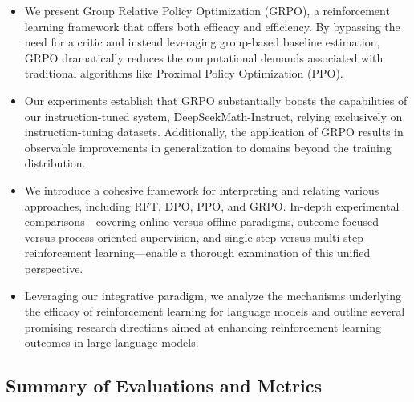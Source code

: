 \begin{itemize}[topsep=0pt]
    \item We present Group Relative Policy Optimization (GRPO), a reinforcement learning framework that offers both efficacy and efficiency. By bypassing the need for a critic and instead leveraging group-based baseline estimation, GRPO dramatically reduces the computational demands associated with traditional algorithms like Proximal Policy Optimization (PPO).
    \item Our experiments establish that GRPO substantially boosts the capabilities of our instruction-tuned system, DeepSeekMath-Instruct, relying exclusively on instruction-tuning datasets. Additionally, the application of GRPO results in observable improvements in generalization to domains beyond the training distribution.
    \item We introduce a cohesive framework for interpreting and relating various approaches, including RFT, DPO, PPO, and GRPO. In-depth experimental comparisons—covering online versus offline paradigms, outcome-focused versus process-oriented supervision, and single-step versus multi-step reinforcement learning—enable a thorough examination of this unified perspective.
    \item Leveraging our integrative paradigm, we analyze the mechanisms underlying the efficacy of reinforcement learning for language models and outline several promising research directions aimed at enhancing reinforcement learning outcomes in large language models.
\end{itemize}

\subsection{Summary of Evaluations and Metrics}

